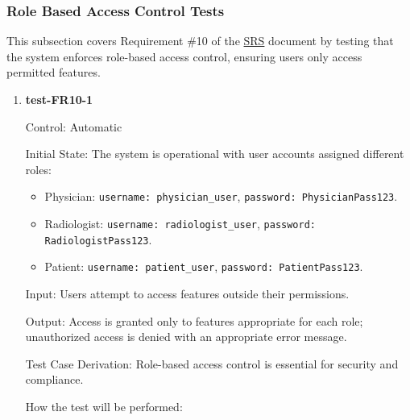 \documentclass[12pt, titlepage]{article}
\begin{document}
\subsubsection{Role Based Access Control Tests}

This subsection covers Requirement \#10 of the \href{https://github.com/RezaJodeiri/CXR-Capstone/blob/main/docs/SRS/SRS.pdf}{SRS} \citep{SRS}
document by testing that the system enforces role-based access control, ensuring users only access permitted features.

\begin{enumerate}

\item \textbf{test-FR10-1} \label{test-FR10-1}

Control: Automatic

Initial State: The system is operational with user accounts assigned different roles:
\begin{itemize}
  \item Physician: \texttt{username: physician\_user}, \texttt{password: PhysicianPass123}.
  \item Radiologist: \texttt{username: radiologist\_user}, \texttt{password: RadiologistPass123}.
  \item Patient: \texttt{username: patient\_user}, \texttt{password: PatientPass123}.
\end{itemize}

Input: Users attempt to access features outside their permissions.

Output: Access is granted only to features appropriate for each role; unauthorized access is denied with an appropriate error message.

Test Case Derivation: Role-based access control is essential for security and compliance.

How the test will be performed:


\end{enumerate}
\end{document}
